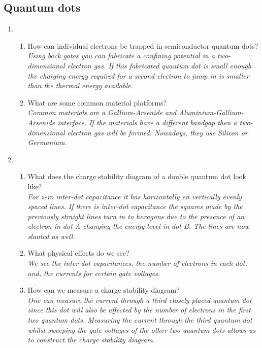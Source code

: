 \documentclass[a4paper]{scrartcl}
\newcommand{\qa}[2]{#1\\ \textit{#2}}
\begin{document}
\subsection*{Quantum dots}
\begin{enumerate}[label=(\alph*)]
  \item \begin{enumerate}[label=(\roman*)]
    \item \qa{How can individual electrons be trapped in semiconductor quantum dots?}{Using back gates you can fabricate a confining potential in a two-dimensional electron gas. If this fabricated quantum dot is small enough the charging energy required for a second electron to jump in is smaller than the thermal energy available.}
    \item \qa{What are some common material platforms?}{Common materials are a Gallium-Arsenide and Aluminium-Gallium-Arsenide interface. If the materials have a different bandgap then a two-dimensional electron gas will be formed. Nowadays, they use Silicon or Germanium.}
  \end{enumerate}

  \item \begin{enumerate}[label=(\roman*)]
    \item \qa{What does the charge stability diagram of a double quantum dot look like?}{For zero inter-dot capacitance it has horizontally en vertically evenly spaced lines. If there is inter-dot capacitance the squares made by the previously straight lines turn in to hexagons due to the presence of an electron in dot A changing the energy level in dot B. The lines are now slanted as well.}
    \item \qa{What physical effects do we see?}{We see the inter-dot capacitances, the number of electrons in each dot, and, the currents for certain gate voltages.}
    \item \qa{How can we measure a charge stability diagram?}{One can measure the current through a third closely placed quantum dot since this dot will also be affected by the number of electrons in the first two quantum dots. Measuring the current through the third quantum dot whilst sweeping the gate voltages of the other two quantum dots allows us to construct the charge stability diagram.}
  \end{enumerate}


\end{enumerate}
\end{document}
